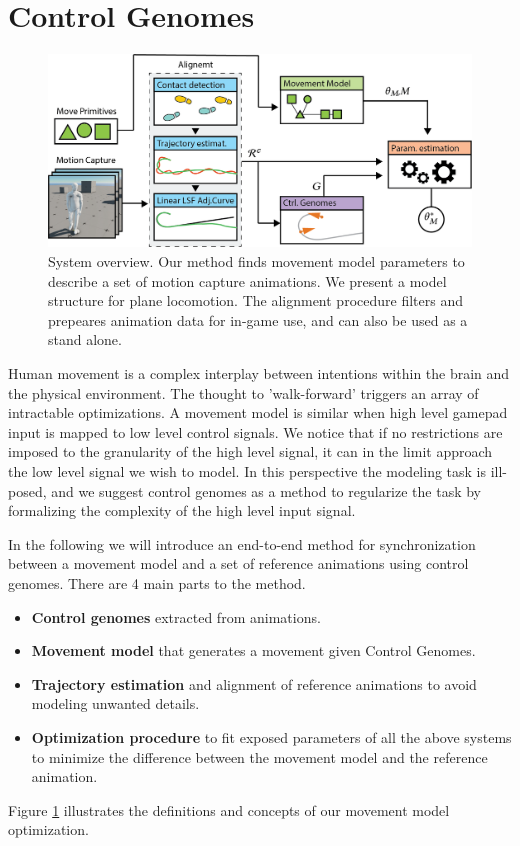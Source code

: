 \section{Control Genomes}
\begin{figure}
    \centering
    \includegraphics[width=1\columnwidth]{img/overview}
    \caption{System overview. Our method finds movement model parameters to describe a set of motion capture animations. We present a model structure for plane locomotion. The alignment procedure filters and prepeares animation data for in-game use, and can also be used as a stand alone.}
    \label{fig:movement:overview}
\end{figure}
Human movement is a complex interplay between intentions within the brain and the physical environment. The thought to 'walk-forward' triggers an array of intractable optimizations. A movement model is similar when high level gamepad input is mapped to low level control signals. We notice that if no restrictions are imposed to the granularity of the high level signal, it can in the limit approach the low level signal we wish to model. In this perspective the modeling task is ill-posed, and we suggest control genomes as a method to regularize the task by formalizing the complexity of the high level input signal.   

In the following we will introduce an end-to-end method for synchronization between a movement model and a set of reference animations using control genomes. There are 4 main parts to the method. 
\begin{itemize}
    \item \textbf{Control genomes} extracted from animations.
    \item \textbf{Movement model} that generates a movement given Control Genomes.
    \item \textbf{Trajectory estimation} and alignment of reference animations to avoid modeling unwanted details. 
    \item \textbf{Optimization procedure} to fit exposed parameters of all the above systems to minimize the difference between the movement model and the reference animation.
\end{itemize}
Figure \ref{fig:movement:overview} illustrates the definitions and concepts of our movement model optimization.


